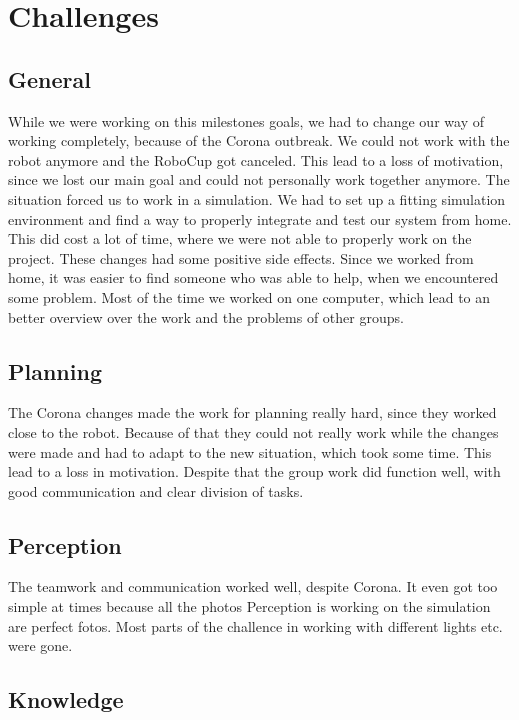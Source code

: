 \documentclass[main.tex]{subfiles}
\begin{document}
	
	\chapter{Challenges}

\section{General}

While we were working on this milestones goals, we had to change our way of working completely, because of the Corona outbreak.
We could not work with the robot anymore and the RoboCup got canceled. This lead to a loss of motivation, since we lost our main goal and could not personally work together anymore.
The situation forced us to work in a simulation. We had to set up a fitting simulation environment and find a way to properly integrate and test our system from home. This did cost a lot of time, where we were not able to properly work on the project.
These changes had some positive side effects. Since we worked from home, it was easier to find someone who was able to help, when we encountered some problem. Most of the time we worked on one computer, which lead to an better overview over the work and the problems of other groups.

\section{Planning}

The Corona changes made the work for planning really hard, since they worked close to the robot. Because of that they could not really work while the changes were made and had to adapt to the new situation, which took some time.
This lead to a loss in motivation. Despite that the group work did function well, with good communication and clear division of tasks.

\section{Perception}

The teamwork and communication worked well, despite Corona. It even got too simple at times because all the photos Perception is working on the simulation are perfect fotos. Most parts of the challence in working with different lights etc. were gone.

\section{Knowledge}
\end{document}
